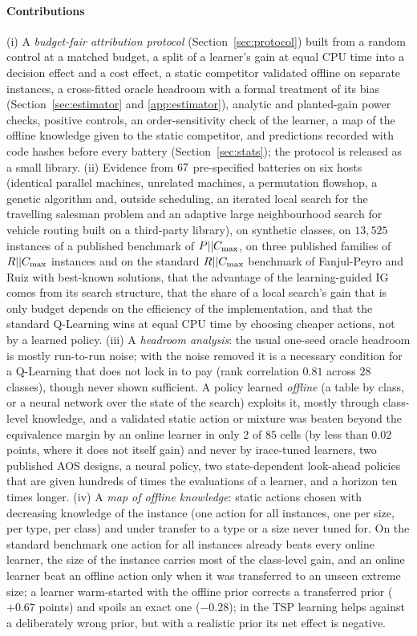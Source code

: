 \paragraph{Contributions}
(i) A \emph{budget-fair attribution protocol} (Section~\ref{sec:protocol}) built from a random control at a matched budget, a split of a learner's gain at equal CPU time into a decision effect and a cost effect, a static competitor validated offline on separate instances, a cross-fitted oracle headroom with a formal treatment of its bias (Section~\ref{sec:estimator} and \ref{app:estimator}), analytic and planted-gain power checks, positive controls, an order-sensitivity check of the learner, a map of the offline knowledge given to the static competitor, and predictions recorded with code hashes before every battery (Section~\ref{sec:stats}); the protocol is released as a small library.
(ii) Evidence from $67$ pre-specified batteries on six hosts (identical parallel machines, unrelated machines, a permutation flowshop, a genetic algorithm and, outside scheduling, an iterated local search for the travelling salesman problem and an adaptive large neighbourhood search for vehicle routing built on a third-party library), on synthetic classes, on $13{,}525$ instances of a published benchmark of $P||C_{\max}$, on three published families of $R||C_{\max}$ instances and on the standard $R||C_{\max}$ benchmark of Fanjul-Peyro and Ruiz with best-known solutions, that the advantage of the learning-guided IG comes from its search structure, that the share of a local search's gain that is only budget depends on the efficiency of the implementation, and that the standard Q-Learning wins at equal CPU time by choosing cheaper actions, not by a learned policy.
(iii) A \emph{headroom analysis}: the usual one-seed oracle headroom is mostly run-to-run noise; with the noise removed it is a necessary condition for a Q-Learning that does not lock in to pay (rank correlation $0.81$ across $28$ classes), though never shown sufficient. A policy learned \emph{offline} (a table by class, or a neural network over the state of the search) exploits it, mostly through class-level knowledge, and a validated static action or mixture was beaten beyond the equivalence margin by an online learner in only $2$ of $85$ cells (by less than $0.02$ points, where it does not itself gain) and never by irace-tuned learners, two published AOS designs, a neural policy, two state-dependent look-ahead policies that are given hundreds of times the evaluations of a learner, and a horizon ten times longer.
(iv) A \emph{map of offline knowledge}: static actions chosen with decreasing knowledge of the instance (one action for all instances, one per size, per type, per class) and under transfer to a type or a size never tuned for. On the standard benchmark one action for all instances already beats every online learner, the size of the instance carries most of the class-level gain, and an online learner beat an offline action only when it was transferred to an unseen extreme size; a learner warm-started with the offline prior corrects a transferred prior ($+0.67$ points) and spoils an exact one ($-0.28$); in the TSP learning helps against a deliberately wrong prior, but with a realistic prior its net effect is negative.
